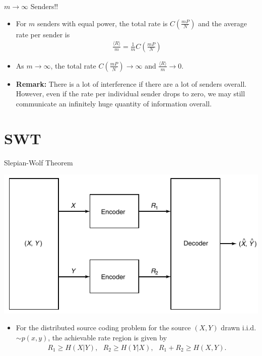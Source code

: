 \documentclass{beamer}
\newcommand{\green}[1]{{\color{ForestGreen} #1}}
\begin{document}
{\begin{frame}{$m \rightarrow \infty$ Senders!!}
\begin{itemize}
\item<1-> For $m$ senders with equal power, the total rate is $C(\frac{mP}{N})$ and the average rate per sender is 
%
\begin{eqnarray*}
    \frac{\langle R \rangle}{m}= \frac{1}{m}C\left(\frac{mP}{N}\right)
\end{eqnarray*}
%

\item<2-> As $m \rightarrow \infty$, the total rate $C(\frac{mP}{N}) \rightarrow \infty$ and $\frac{\langle R \rangle}{m} \rightarrow 0$. 

\item<3-> \textbf{Remark:} There is a lot of interference if there are a lot of senders overall. However, even if the rate per individual sender drops to zero, \green{we may still communicate an infinitely huge quantity of information overall}.

	\end{itemize}
\end{frame}

\section{SWT}

\begin{frame}{Slepian-Wolf Theorem}

\begin{center}
    \includegraphics[scale = 0.3]{Diagrams/SWC.png}
\end{center}

 \begin{itemize}
	\justifying

\item<1-> \begin{tcolorbox}[colback=blue!10, colframe=blue, title=Slepian-Wolf Theorem]
For the distributed source coding problem for the source $(X,Y)$ drawn i.i.d. $\sim p(x,y)$, the achievable rate region is given by
%
\begin{eqnarray*}
  R_1 \geq H(X|Y), \text{ } R_2 \geq H(Y|X), \text{ } R_1+R_2 \geq H(X,Y).
\end{eqnarray*}
%
\end{tcolorbox}


\end{itemize}
\end{frame}}
\end{document}
